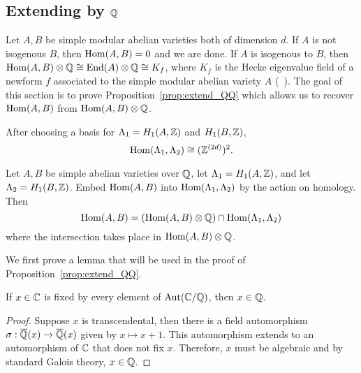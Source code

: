\subsection{Extending by $\mathbb{Q}$}%
\label{sub:extending_by_qq_}

Let $A, B$ be simple modular abelian varieties both of dimension $d$. If $A$ is
not isogenous $B$, then $\operatorname{Hom}(A, B)=0$ and we are done. If $A$ is isogenous to
$B$, then $\operatorname{Hom}(A,B)\otimes \mathbb{Q} \cong \operatorname{End}(A)\otimes \mathbb{Q}\cong K_f$, where $K_f$
is the Hecke eigenvalue field of a newform $f$ associated to the simple modular
abelian variety $A$ (~\cite{shimura}). The goal of this section is to prove
Proposition~\ref{prop:extend_QQ} which allows us to recover $\operatorname{Hom}(A,B)$ from
$\operatorname{Hom}(A,B)\otimes \mathbb{Q}$.

After choosing a basis for $\Lambda_1 = H_1(A, \mathbb{Z})$ and $H_1(B, \mathbb{Z})$, 
\[
    \operatorname{Hom}(\Lambda_1, \Lambda_2) \cong (\mathbb{Z}^{(2d)})^2.
\]
\begin{proposition}%
    \label{prop:extend_QQ}
    Let $A, B$ be simple abelian varieties over $\mathbb{Q}$, let $\Lambda_1=H_1(A,
    \mathbb{Z})$, and let $\Lambda_2=H_1(B, \mathbb{Z})$. Embed $\operatorname{Hom}(A, B)$ into
    $\operatorname{Hom}(\Lambda_1, \Lambda_2)$ by the action on homology. Then
    \[
        \operatorname{Hom}(A, B) = 
        (\operatorname{Hom}(A, B) \otimes \mathbb{Q})\cap \operatorname{Hom}(\Lambda_1, \Lambda_2)
    \]
    where the intersection takes place in $\operatorname{Hom}(A,B)\otimes \mathbb{Q}$.
\end{proposition}

We first prove a lemma that will be used in the proof of
Proposition~\ref{prop:extend_QQ}.

\begin{lemma}%
    \label{lem:aut}
    If $x\in \mathbb{C}$ is fixed by every element of $\operatorname{Aut}(\mathbb{C}/\mathbb{Q})$, then $x\in
    \mathbb{Q}$.
\end{lemma}
\begin{proof}
    Suppose $x$ is transcendental, then there is a field automorphism
    $\sigma:\overline{\mathbb{Q}}(x)\to\overline{\mathbb{Q}}(x)$ given by $x\mapsto x+1$. This automorphism
    extends to an automorphism of $\mathbb{C}$ that does not fix $x$. Therefore, $x$
    must be algebraic and by standard Galois theory, $x\in \mathbb{Q}$.
\end{proof}

